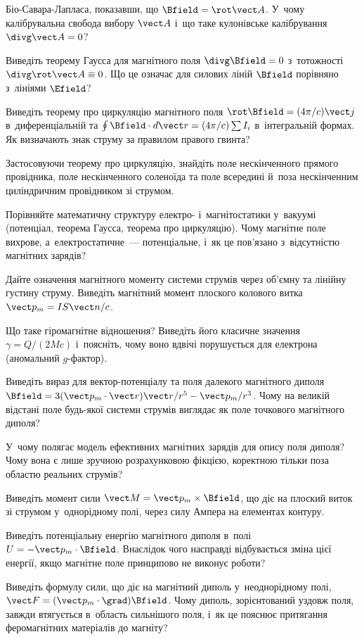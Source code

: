 \begin{Questions}
\begin{quizlist}
		Біо-Савара-Лапласа, показавши, що $\Bfield=\rot\vect A$. У~чому калібрувальна
		свобода вибору $\vect A$ і~що таке кулонівське калібрування $\divg\vect A=0$?
		\item Виведіть теорему Гаусса для магнітного поля $\divg\Bfield=0$ з~тотожності
		$\divg\rot\vect A\equiv0$. Що це означає для силових ліній $\Bfield$ порівняно
		з~лініями $\Efield$?
		\item Виведіть теорему про циркуляцію магнітного поля $\rot\Bfield = (4\pi/c)\vect j$
		в~диференціальній та $\oint\Bfield\cdot d\vect r = (4\pi/c)\sum I_i$ в~інтегральній
		формах. Як визначають знак струму за правилом правого гвинта?
		\item Застосовуючи теорему про циркуляцію, знайдіть поле нескінченного прямого
		провідника, поле нескінченного соленоїда та поле всередині й~поза нескінченним
		циліндричним провідником зі струмом.
		\item Порівняйте математичну структуру електро- і~магнітостатики у~вакуумі (потенціал,
		теорема Гаусса, теорема про циркуляцію). Чому магнітне поле вихрове,
		а~електростатичне~--- потенціальне, і~як це пов'язано з~відсутністю магнітних
		зарядів?
		\item Дайте означення магнітного моменту системи струмів через об'ємну та лінійну
		густину струму. Виведіть магнітний момент плоского колового витка $\vect p_m =
			IS\vect n/c$.
		\item Що таке гіромагнітне відношення? Виведіть його класичне значення $\gamma =
			Q/(2Mc)$ і~поясніть, чому воно вдвічі порушується для електрона (аномальний
		$g$-фактор).
		\item Виведіть вираз для вектор-потенціалу та поля далекого магнітного диполя $\Bfield
			= 3(\vect p_m\cdot\vect r)\vect r/r^5 - \vect p_m/r^3$. Чому на великій відстані
		поле будь-якої системи струмів виглядає як поле точкового магнітного диполя?
		\item У~чому полягає модель ефективних магнітних зарядів для опису поля диполя? Чому
		вона є лише зручною розрахунковою фікцією, коректною тільки поза областю реальних
		струмів?
		\item Виведіть момент сили $\vect M = \vect p_m\times\Bfield$, що діє на плоский виток
		зі струмом у~однорідному полі, через силу Ампера на елементах контуру.
		\item Виведіть потенціальну енергію магнітного диполя в~полі $U=-\vect
			p_m\cdot\Bfield$. Внаслідок чого насправді відбувається зміна цієї енергії, якщо
		магнітне поле принципово не виконує роботи?
		\item Виведіть формулу сили, що діє на магнітний диполь у~неоднорідному полі, $\vect F
			= (\vect p_m\cdot\grad)\Bfield$. Чому диполь, зорієнтований уздовж поля, завжди
		втягується в~область сильнішого поля, і~як це пояснює притягання феромагнітних
		матеріалів до магніту?
	\end{quizlist}
\end{Questions}